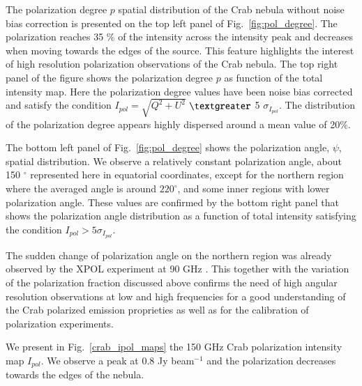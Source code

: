 \documentclass[twocolumn,traditabstract]{aa}
\begin{document}
The polarization degree $p$ spatial distribution of the Crab nebula without
noise bias correction is presented on the top left panel of
Fig.~\ref{fig:pol_degree}. The polarization reaches 35 \% of the intensity
across the intensity peak and decreases when moving towards the edges of the
source.  This feature highlights the interest of high resolution polarization
observations of the Crab nebula. The top right panel of the figure shows the
polarization degree $p$ as function of the total intensity map. Here the
polarization degree values have been noise bias corrected and satisfy the
condition $I_{pol}=\sqrt{Q^2+U^2}$ $\textgreater$ 5 $\sigma_{I_{pol}}$. The
distribution of the polarization degree appears highly dispersed around a mean
value of 20\%.

The bottom left panel of Fig.~\ref{fig:pol_degree} shows the polarization angle,
$\psi$, spatial distribution.  We observe a relatively constant polarization
angle, about 150 $^{\circ}$ represented here in equatorial coordinates, except
for the northern region where the averaged angle is around $220^{\circ}$, and
some inner regions with lower polarization angle.  These values are confirmed by
the bottom right panel that shows the polarization angle distribution as a
function of total intensity satisfying the condition $I_{pol} > 5\sigma_{I_{pol}}$.

The sudden change of polarization angle on the northern region was already
observed by the XPOL experiment at 90 GHz \citep{aumont2010}.  This together
with the variation of the polarization fraction discussed above confirms the
need of high angular resolution observations at low and high frequencies for a
good understanding of the Crab polarized emission proprieties as well as
  for the calibration of polarization experiments.

We present in Fig.~\ref{crab_ipol_maps} the 150 GHz Crab polarization intensity
map $I_{pol}$. We observe a peak at 0.8 Jy beam$^{-1}$ and the polarization
decreases towards the edges of the nebula.

\end{document}
